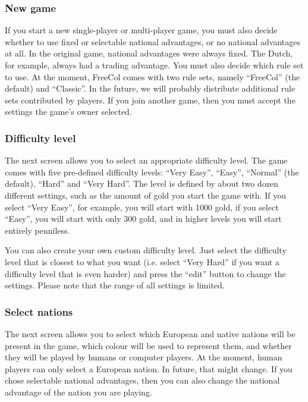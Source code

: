 \documentclass[12pt]{book}
\begin{document}
\hypertarget{New game}{\subsubsection{New game}}

If you start a new single-player or multi-player game, you must also
decide whether to use fixed or selectable national advantages, or no
national advantages at all. In the original game, national advantages
were always fixed. The Dutch, for example, always had a trading
advantage. You must also decide which rule set to use. At the moment,
FreeCol comes with two rule sets, namely ``FreeCol'' (the default) and
``Classic''. In the future, we will probably distribute additional
rule sets contributed by players. If you join another game, then you
must accept the settings the game's owner selected.


\hypertarget{difficulty level}{\subsubsection{Difficulty level}}

The next screen allows you to select an appropriate difficulty
level. The game comes with five pre-defined difficulty levels: ``Very
Easy'', ``Easy'', ``Normal'' (the default), ``Hard'' and ``Very
Hard''. The level is defined by about two dozen different settings,
such as the amount of gold you start the game with. If you select
``Very Easy'', for example, you will start with 1000 gold, if you
select ``Easy'', you will start with only 300 gold, and in higher
levels you will start entirely penniless.

You can also create your own custom difficulty level. Just select the
difficulty level that is closest to what you want (i.e. select ``Very
Hard'' if you want a difficulty level that is even harder) and press
the ``edit'' button to change the settings. Please note that the range
of all settings is limited.


\hypertarget{select nations}{\subsubsection{Select nations}}

The next screen allows you to select which European and native nations
will be present in the game, which colour will be used to represent
them, and whether they will be played by humans or computer
players. At the moment, human players can only select a European
nation. In future, that might change. If you chose selectable national
advantages, then you can also change the national advantage of the
nation you are playing.
\end{document}
